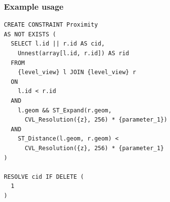 \documentclass{beamer}
\begin{document}
\begin{frame}[fragile]
\frametitle{Example usage}
\begin{lstlisting}
CREATE CONSTRAINT Proximity
AS NOT EXISTS (
  SELECT l.id || r.id AS cid, 
    Unnest(array[l.id, r.id]) AS rid
  FROM
    {level_view} l JOIN {level_view} r
  ON
    l.id < r.id
  AND
    l.geom && ST_Expand(r.geom, 
      CVL_Resolution({z}, 256) * {parameter_1})
  AND
    ST_Distance(l.geom, r.geom) < 
      CVL_Resolution({z}, 256) * {parameter_1}
)

RESOLVE cid IF DELETE (
  1
)
\end{lstlisting}
\end{frame}

\end{document}

